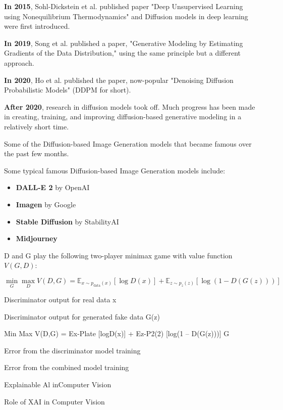 \textbf{In 2015}, Sohl-Dickstein et al. published paper "Deep Unsupervised Learning using Nonequilibrium Thermodynamics" and Diffusion models in deep learning were first introduced.

\textbf{In 2019}, Song et al. published a paper, "Generative Modeling by Estimating Gradients of the Data Distribution," using the same principle but a different approach.

\textbf{In 2020}, Ho et al. published the paper, now-popular "Denoising Diffusion Probabilistic Models" (DDPM for short).

\textbf{After 2020}, research in diffusion models took off. Much progress has been made in creating, training, and improving diffusion-based generative modeling in a relatively short time.

Some of the Diffusion-based Image Generation models that became famous over the past few months.

Some typical famous Diffusion-based Image Generation models include:
\begin{itemize}
    \item \textbf{DALL-E 2} by OpenAI
    \item \textbf{Imagen} by Google
    \item \textbf{Stable Diffusion} by StabilityAI
    \item \textbf{Midjourney}
\end{itemize}

D and G play the following two-player minimax game with value function $V (G, D)$:

\begin{equation*}
    \min_{G} \max_{D} V(D,G) = \mathbb{E}_{x \sim p_{\text{data}}(x)}[\log D(x)] + \mathbb{E}_{z \sim p_{z}(z)}[\log(1 - D(G(z)))]
\end{equation*}

Discriminator output for real data x

Discriminator output for generated fake data G(z)

Min Max V(D,G) = Ex-Plate [logD(x)] + Ez-P2(2) [log(1 – D(G(z)))] G

Error from the discriminator model training

Error from the combined model training








Explainable Al inComputer Vision

Role of XAI in Computer Vision

